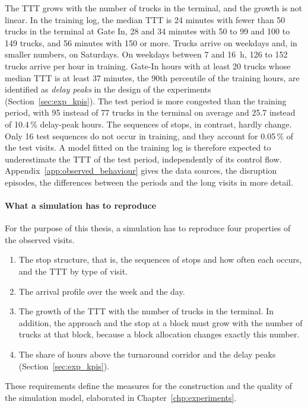 \label{sec:obs_summary}
The TTT grows with the number of trucks in the terminal, and the growth is not
linear. In the training log, the median TTT is 24 minutes with fewer than 50
trucks in the terminal at Gate In, 28 and 34 minutes with 50 to 99 and 100 to
149 trucks, and 56 minutes with 150 or more. Trucks arrive on weekdays and, in
smaller numbers, on Saturdays. On weekdays between 7 and 16~h, 126 to 152 trucks
arrive per hour in training. Gate-In hours with at least 20 trucks whose median TTT is at least 37 minutes, the
90th percentile of the training hours, are identified as \emph{delay peaks} in the
design of the experiments (Section~\ref{sec:exp_kpis}). The test period is more
congested than the training period, with 95 instead of 77 trucks in the terminal
on average and 25.7 instead of 10.4\,\% delay-peak hours. The sequences of stops,
in contrast, hardly change. Only 16 test sequences do not occur in training, and
they account for 0.05\,\% of the test visits. A model fitted on the training log is
therefore expected to underestimate the TTT of the test period, independently of
its control flow. Appendix~\ref{app:observed_behaviour} gives the data sources, the disruption
episodes, the differences between the periods and the long visits in more detail.

\paragraph{What a simulation has to reproduce}
\label{sec:obs_implications}
For the purpose of this thesis, a simulation has to reproduce four properties of
the observed visits.
\begin{enumerate}
\item The stop structure, that is, the sequences of stops and how often each
occurs, and the TTT by type of visit.
\item The arrival profile over the week and the day.
\item The growth of the TTT with the number of trucks in the terminal. In
addition, the approach and the stop at a block must grow with the number of
trucks at that block, because a block allocation changes exactly this number.
\item The share of hours above the turnaround corridor and the delay peaks
(Section~\ref{sec:exp_kpis}).
\end{enumerate}
These requirements define the measures for the construction and the quality of
the simulation model, elaborated in Chapter~\ref{chp:experiments}.

